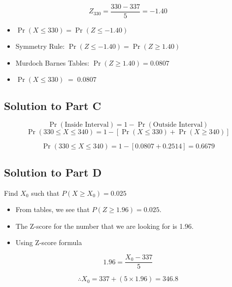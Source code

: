 \documentclass[a4paper,12pt]{article}
\begin{document}
\[Z_{330} = \frac{330-337}{5} = -1.40\]

\begin{itemize}
    \item $\Pr(X\leq 330) = \Pr(Z \leq -1.40)$
    \item Symmetry Rule: $\Pr(Z \leq -1.40) = \Pr(Z \geq 1.40)$
    \item Murdoch Barnes Tables: $\Pr(Z \geq 1.40) = 0.0807$
    \item $\Pr(X\leq 330) \;=\; 0.0807$
\end{itemize}

\newpage

\subsection*{Solution to Part C}
\[\Pr(\mbox{Inside Interval})= 1 - \Pr(\mbox{Outside Interval}) \]
\[\Pr(330\leq X \leq 340)= 1 - \left[\Pr(X\leq 330) + \Pr(X\geq 340)\right] \]

\[\Pr(330\leq X \leq 340)= 1- [0.0807 +  0.2514] = 0.6679\]



\subsection*{Solution to Part D}
Find $X_0$ such that  $P(X \geq X_0)= 0.025$

\begin{itemize}
\item From tables, we see that $P(Z \geq 1.96) = 0.025$.
\item The Z-score for the number that we are looking for is 1.96.
\item Using Z-score formula
\end{itemize}
\[ 1.96 = \frac{X_0 - 337}{5} \]

\[ \therefore X_0 = 337 + (5 \times 1.96) =  346.8\]
\end{document}
